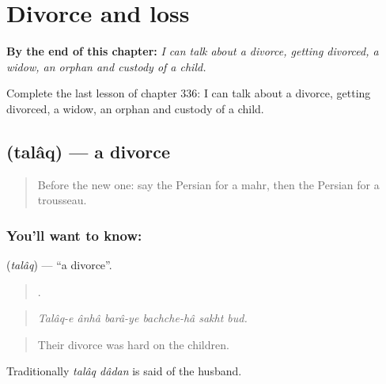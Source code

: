 
\chapter{Divorce and loss}
\label{ch:fa-divorce-and-loss}

\begin{chapteropening}
\textbf{By the end of this chapter:} \emph{I can talk about a divorce, getting divorced, a widow, an orphan and custody of a child.}

Complete the last lesson of chapter 336: I can talk about a divorce, getting divorced, a widow, an orphan and custody of a child.
\end{chapteropening}

\section[\texorpdfstring{\fa{طلاق} (talâq)}{طلاق (talâq)}]{ (talâq) — a divorce}

\label{lesson:FA-C336-talaq}



\begin{quote}
Before the new one: say the Persian for a mahr, then the Persian for a trousseau.
\end{quote}

\subsection*{You'll want to know: }
\textbf{} (\emph{talâq}) — \textquotedblleft{}a divorce\textquotedblright{}.

\begin{quote}
      .
\end{quote}

\begin{quote}
\emph{Talâq-e ânhâ barâ-ye bachche-hâ sakht bud.}
\end{quote}

\begin{quote}
Their divorce was hard on the children.
\end{quote}

Traditionally \emph{talâq dâdan} is said of the husband.

